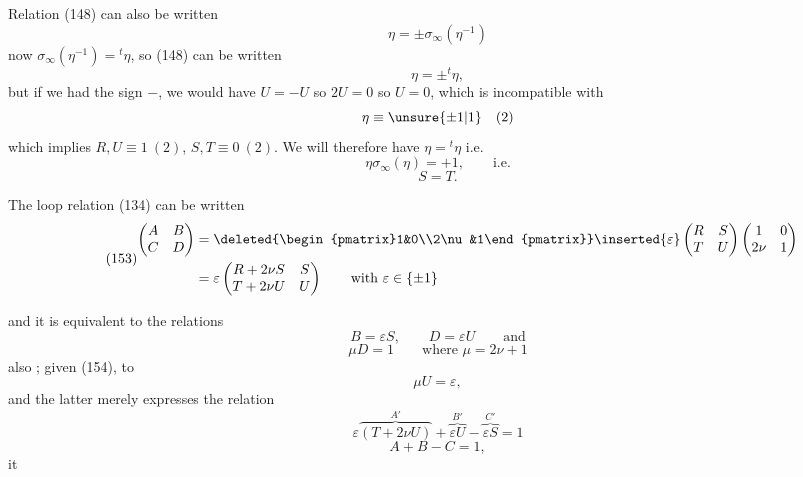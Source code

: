 Relation (148) can also be written
\[
\eta=\pm\sigma_\infty(\eta^{-1})
\]
now $\sigma_\infty(\eta^{-1})={}^t\eta$, so (148) can be written
\[
\eta=\pm{}^t\eta,
\]
but if we had the sign $-$, we would have $U=-U$ so $2U=0$ so $U=0$, which is incompatible with
\[
\eta\equiv\unsure{\pm1|1}\quad(2)
\]
which implies $R,U\equiv1\ (2)$, $S,T\equiv0\ (2)$. We will therefore have $\eta={}^t\eta$ i.e.
\[
\tag{151}
\eta\sigma_\infty(\eta)=+1,\qquad\text{i.e.}
\]
\[
\tag{152}
S=T.
\]

The loop relation (134) can be written
\[
\tag{153}
\begin{aligned}
\begin{pmatrix}A&B\\C&D\end{pmatrix}
&=\deleted{\begin{pmatrix}1&0\\2\nu&1\end{pmatrix}}
\inserted{\varepsilon}\begin{pmatrix}R&S\\T&U\end{pmatrix}
\begin{pmatrix}1&0\\2\nu&1\end{pmatrix}\\
&=\varepsilon\begin{pmatrix}R+2\nu S&S\\T+2\nu U&U\end{pmatrix}
\qquad\text{with }\varepsilon\in\{\pm1\}
\end{aligned}
\]


and it is equivalent to the relations
\[
\tag{154}
B=\varepsilon S,\qquad D=\varepsilon U\qquad\text{and}
\]
\[
\tag{155}
\mu D=1\qquad\text{where }\mu=2\nu+1
\]
 also ; given (154), to
\[
\tag{155bis}
\mu U=\varepsilon,
\]
and the latter merely expresses  the relation
\[
\varepsilon\overbrace{(T+2\nu U)}^{A'}
+\overbrace{\varepsilon U}^{B'}-\overbrace{\varepsilon S}^{C'}=1
\]
\[
A+B-C=1,
\]
it